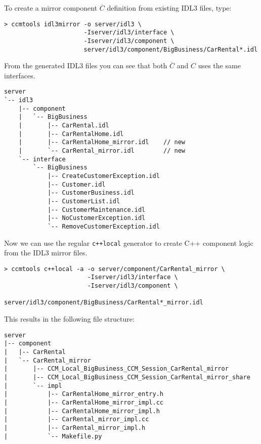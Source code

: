 To create a mirror component $\overline{C}$ definition from existing
IDL3 files, type:
\begin{small}
\begin{verbatim}
> ccmtools idl3mirror -o server/idl3 \
                      -Iserver/idl3/interface \
                      -Iserver/idl3/component \
                      server/idl3/component/BigBusiness/CarRental*.idl
\end{verbatim}
\end{small}

From the generated IDL3 files you can see that both $\overline{C}$ and $C$ 
uses the same interfaces.
\begin{small}
\begin{verbatim}
server
`-- idl3
    |-- component
    |   `-- BigBusiness
    |       |-- CarRental.idl
    |       |-- CarRentalHome.idl
    |       |-- CarRentalHome_mirror.idl    // new
    |       `-- CarRental_mirror.idl        // new
    `-- interface
        `-- BigBusiness
            |-- CreateCustomerException.idl
            |-- Customer.idl
            |-- CustomerBusiness.idl
            |-- CustomerList.idl
            |-- CustomerMaintenance.idl
            |-- NoCustomerException.idl
            `-- RemoveCustomerException.idl
\end{verbatim}
\end{small}

Now we can use the regular {\tt c++local} generator to create C++ component 
logic from the IDL3 mirror files.
\begin{small}
\begin{verbatim}
> ccmtools c++local -a -o server/component/CarRental_mirror \
                       -Iserver/idl3/interface \
                       -Iserver/idl3/component \
                       server/idl3/component/BigBusiness/CarRental*_mirror.idl
\end{verbatim}
\end{small}
This results in the following file structure:
\begin{small}
\begin{verbatim}
server
|-- component
|   |-- CarRental
|   `-- CarRental_mirror
|       |-- CCM_Local_BigBusiness_CCM_Session_CarRental_mirror
|       |-- CCM_Local_BigBusiness_CCM_Session_CarRental_mirror_share
|       `-- impl
|           |-- CarRentalHome_mirror_entry.h
|           |-- CarRentalHome_mirror_impl.cc
|           |-- CarRentalHome_mirror_impl.h
|           |-- CarRental_mirror_impl.cc
|           |-- CarRental_mirror_impl.h
|           `-- Makefile.py
\end{verbatim}
\end{small}

